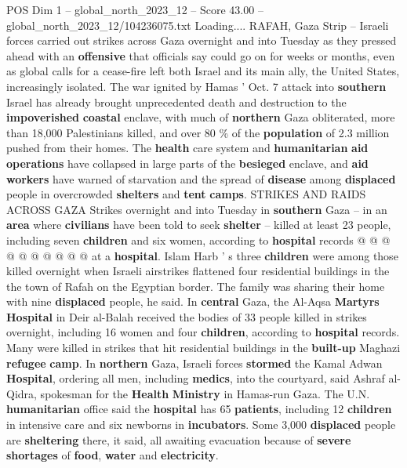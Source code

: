 \begin{textsample}{POS Dim 1 – global\_north\_2023\_12 – Score 43.00 – global\_north\_2023\_12/104236075.txt}  \label{ex:f1_pos_087}
Loading....
RAFAH, Gaza Strip -- Israeli forces carried out strikes across Gaza overnight and into Tuesday as they pressed ahead with an \textbf{offensive} that officials say could go on for weeks or months, even as global calls for a cease-fire left both Israel and its main ally, the United States, increasingly isolated.
The war ignited by Hamas ' Oct. 7 attack into \textbf{southern} Israel has already brought unprecedented death and destruction to the \textbf{impoverished} \textbf{coastal} enclave, with much of \textbf{northern} Gaza obliterated, more than 18,000 Palestinians killed, and over 80 \% of the \textbf{population} of 2.3 million pushed from their homes.
The \textbf{health} care system and \textbf{humanitarian} \textbf{aid} \textbf{operations} have collapsed in large parts of the \textbf{besieged} enclave, and \textbf{aid} \textbf{workers} have warned of starvation and the spread of \textbf{disease} among \textbf{displaced} people in overcrowded \textbf{shelters} and \textbf{tent} \textbf{camps}.
STRIKES AND RAIDS ACROSS GAZA Strikes overnight and into Tuesday in \textbf{southern} Gaza -- in an \textbf{area} where \textbf{civilians} have been told to seek \textbf{shelter} -- killed at least 23 people, including seven \textbf{children} and six women, according to \textbf{hospital} records @ @ @ @ @ @ @ @ @ @ at a \textbf{hospital}.
Islam Harb ' s three \textbf{children} were among those killed overnight when Israeli airstrikes flattened four residential buildings in the the town of Rafah on the Egyptian border.
The family was sharing their home with nine \textbf{displaced} people, he said.
In \textbf{central} Gaza, the Al-Aqsa \textbf{Martyrs} \textbf{Hospital} in Deir al-Balah received the bodies of 33 people killed in strikes overnight, including 16 women and four \textbf{children}, according to \textbf{hospital} records.
Many were killed in strikes that hit residential buildings in the \textbf{built-up} Maghazi \textbf{refugee} \textbf{camp}.
In \textbf{northern} Gaza, Israeli forces \textbf{stormed} the Kamal Adwan \textbf{Hospital}, ordering all men, including \textbf{medics}, into the courtyard, said Ashraf al-Qidra, spokesman for the \textbf{Health} \textbf{Ministry} in Hamas-run Gaza.
The U.N. \textbf{humanitarian} office said the \textbf{hospital} has 65 \textbf{patients}, including 12 \textbf{children} in intensive care and six newborns in \textbf{incubators}.
Some 3,000 \textbf{displaced} people are \textbf{sheltering} there, it said, all awaiting evacuation because of \textbf{severe} \textbf{shortages} of \textbf{food}, \textbf{water} and \textbf{electricity}.

\end{textsample}
